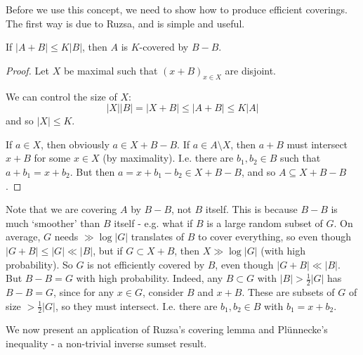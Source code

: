 \documentclass[10pt,a4paper]{article}
\begin{document}
Before we use this concept, we need to show how to produce efficient coverings. The first way is due to Ruzsa, and is simple and useful.
\begin{lemma}
  If $|A+B|\leq K|B|$, then $A$ is $K$-covered by $B-B$.
\end{lemma}
\begin{proof}
  Let $X$ be maximal such that $(x+B)_{x\in X}$ are disjoint.

  We can control the size of $X$:
  \[|X||B|=|X+B| \leq |A+B| \leq K|A|\]
  and so $|X|\leq K$.

  If $a \in X$, then obviously $a\in X+B - B$. If $a \in A\setminus X$, then $a+B$ must intersect $x+B$ for some $x \in X$ (by maximality). I.e. there are $b_1, b_2 \in B$ such that $a+b_1 = x+b_2$. But then $a= x+b_1-b_2 \in X+B-B$, and so $A \subseteq X+B-B$.
\end{proof}
Note that we are covering $A$ by $B-B$, not $B$ itself. This is because $B-B$ is much `smoother' than $B$ itself - e.g. what if $B$ is a large random subset of $G$. On average, $G$ needs $\gg \log |G|$ translates of $B$ to cover everything, so even though $|G+B| \leq |G| \ll |B|$, but if $G \subset X+B$, then $X \gg \log |G|$ (with high probability). So $G$ is not efficiently covered by $B$, even though $|G+B|\ll |B|$. But $B-B = G$ with high probability. Indeed, any $B\subset G$ with $|B|>\frac12 |G|$ has $B-B=G$, since for any $x \in G$, consider $B$ and $x+B$. These are subsets of $G$ of size $>\frac12 |G|$, so they must intersect. I.e. there are $b_1, b_2 \in B$ with $b_1 = x+b_2$.

We now present an application of Ruzsa's covering lemma and Pl\"unnecke's inequality -  a non-trivial inverse sumset result.
\end{document}
